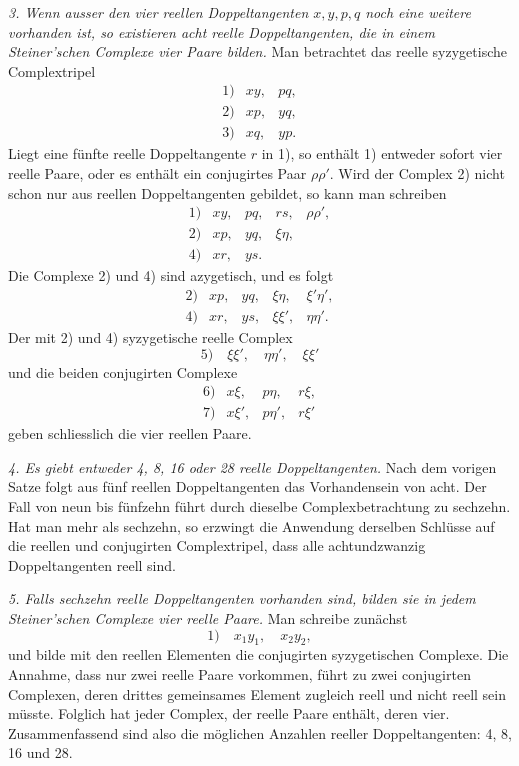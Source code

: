 \documentclass[11pt]{article}
\begin{document}
\emph{3. Wenn ausser den vier reellen Doppeltangenten \(x,y,p,q\) noch eine weitere vorhanden ist, so existieren acht reelle Doppeltangenten, die in einem Steiner'schen Complexe vier Paare bilden.} Man betrachtet das reelle syzygetische Complextripel
\[
\begin{array}{rll}
1)&xy,&pq,\\
2)&xp,&yq,\\
3)&xq,&yp.
\end{array}
\]
Liegt eine fünfte reelle Doppeltangente \(r\) in 1), so enthält 1) entweder sofort vier reelle Paare, oder es enthält ein conjugirtes Paar \(\rho\rho'\). Wird der Complex 2) nicht schon nur aus reellen Doppeltangenten gebildet, so kann man schreiben
\[
\begin{array}{rllllll}
1)&xy,&pq,&rs,&\rho\rho',\\
2)&xp,&yq,&\xi\eta,\\
4)&xr,&ys.
\end{array}
\]
Die Complexe 2) und 4) sind azygetisch, und es folgt
\[
\begin{array}{rllllll}
2)&xp,&yq,&\xi\eta,&\xi'\eta',\\
4)&xr,&ys,&\xi\xi',&\eta\eta'.
\end{array}
\]
Der mit 2) und 4) syzygetische reelle Complex
\[
5)\quad \xi\xi',\quad \eta\eta',\quad \xi\xi'
\]
und die beiden conjugirten Complexe
\[
\begin{array}{rlll}
6)&x\xi,&p\eta,&r\xi,\\
7)&x\xi',&p\eta',&r\xi'
\end{array}
\]
geben schliesslich die vier reellen Paare.

\emph{4. Es giebt entweder 4, 8, 16 oder 28 reelle Doppeltangenten.} Nach dem vorigen Satze folgt aus fünf reellen Doppeltangenten das Vorhandensein von acht. Der Fall von neun bis fünfzehn führt durch dieselbe Complexbetrachtung zu sechzehn. Hat man mehr als sechzehn, so erzwingt die Anwendung derselben Schlüsse auf die reellen und conjugirten Complextripel, dass alle achtundzwanzig Doppeltangenten reell sind.

\emph{5. Falls sechzehn reelle Doppeltangenten vorhanden sind, bilden sie in jedem Steiner'schen Complexe vier reelle Paare.} Man schreibe zunächst
\[
1)\quad x_1y_1,\quad x_2y_2,
\]
und bilde mit den reellen Elementen die conjugirten syzygetischen Complexe. Die Annahme, dass nur zwei reelle Paare vorkommen, führt zu zwei conjugirten Complexen, deren drittes gemeinsames Element zugleich reell und nicht reell sein müsste. Folglich hat jeder Complex, der reelle Paare enthält, deren vier. Zusammenfassend sind also die möglichen Anzahlen reeller Doppeltangenten: 4, 8, 16 und 28.
\end{document}
